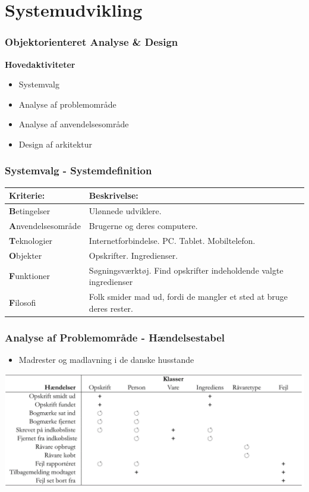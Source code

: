 \section{Systemudvikling}
	\begin{frame}
		\frametitle{Objektorienteret Analyse \& Design}
		\textbf{Hovedaktiviteter}
			\begin{itemize}
				\item Systemvalg
				\item Analyse af problemområde
				\item Analyse af anvendelsesområde
				\item Design af arkitektur
			\end{itemize}
	\end{frame}
		
	\begin{frame}
		\frametitle{Systemvalg - Systemdefinition}
		\begin{center}
    		\begin{tabular}{ | l | p{5cm} |} \hline
   				\textbf{Kriterie:} & \bf{Beskrivelse:} \\ \hline
    			\textbf{B}etingelser & Ulønnede udviklere. \\ \hline
    			\textbf{A}nvendelsesområde & Brugerne og deres computere. \\ \hline
    			\textbf{T}eknologier & Internetforbindelse. PC. Tablet. Mobiltelefon. \\ \hline
    			\textbf{O}bjekter & Opskrifter. Ingredienser. \\ \hline
    			\textbf{F}unktioner & Søgningsværktøj. Find opskrifter indeholdende valgte ingredienser \\ \hline
    			\textbf{F}ilosofi & Folk smider mad ud, fordi de mangler et sted at bruge deres rester. \\ \hline
    		\end{tabular}
		\end{center}
	\end{frame}
	
	\begin{frame}
		\frametitle{Analyse af Problemområde - Hændelsestabel}
		\begin{itemize}
			\item Madrester og madlavning i de danske husstande
		\end{itemize}
		\begin{center}
    		\includegraphics[scale=0.3]{billeder/haendelsestabel.png}
		\end{center}
	\end{frame}
	
